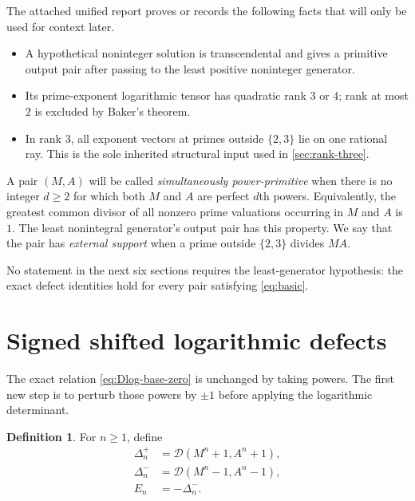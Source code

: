 \documentclass[11pt]{article}
\theoremstyle{definition}
\newtheorem{definition}[theorem]{Definition}
\newcommand{\Dlog}{\mathscr D}
\begin{document}
The attached unified report proves or records the following facts that will only be used
for context later.

\begin{itemize}
\item A hypothetical noninteger solution is transcendental and gives a primitive output
pair after passing to the least positive noninteger generator.
\item Its prime-exponent logarithmic tensor has quadratic rank $3$ or $4$; rank at most
$2$ is excluded by Baker's theorem.
\item In rank $3$, all exponent vectors at primes outside $\{2,3\}$ lie on one rational
ray.  This is the sole inherited structural input used in \cref{sec:rank-three}.
\end{itemize}

A pair $(M,A)$ will be called \emph{simultaneously power-primitive} when there is no
integer $d\ge2$ for which both $M$ and $A$ are perfect $d$th powers.  Equivalently, the
greatest common divisor of all nonzero prime valuations occurring in $M$ and $A$ is $1$.
The least nonintegral generator's output pair has this property.  We say that the pair has
\emph{external support} when a prime outside $\{2,3\}$ divides $MA$.

No statement in the next six sections requires the least-generator hypothesis: the exact
defect identities hold for every pair satisfying \eqref{eq:basic}.

\section{Signed shifted logarithmic defects}\label{sec:shifted}

The exact relation \eqref{eq:Dlog-base-zero} is unchanged by taking powers.  The first new
step is to perturb those powers by $\pm1$ before applying the logarithmic determinant.

\begin{definition}
For $n\ge1$, define
\begin{align}
 \Delta_n^+&=\Dlog(M^n+1,A^n+1),\label{eq:delta-plus}\\
 \Delta_n^-&=\Dlog(M^n-1,A^n-1),\label{eq:delta-minus}\\
 E_n&=-\Delta_n^- .\label{eq:E-def}
\end{align}
\end{definition}
\end{document}
